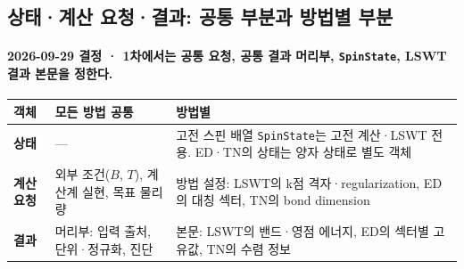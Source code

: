 \subsection{상태·계산 요청·결과: 공통 부분과 방법별 부분}\label{object-scope}
\begingroup%
  \framesubtitle{2026-09-29 결정 · 1차에서는 공통 요청, 공통 결과 머리부, \texttt{SpinState}, LSWT 결과 본문을 정한다.}
  \begin{tabularx}{\textwidth}{@{}p{2.0cm}P{5.0cm}Y@{}}
    \toprule
    객체 & 모든 방법 공통 & 방법별 \\
    \midrule
    \textbf{상태} & — & 고전 스핀 배열 \texttt{SpinState}는 고전 계산·LSWT 전용. ED·TN의 상태는 양자 상태로 별도 객체 \\
    \textbf{계산 요청} & 외부 조건($B$, $T$), 계산계 실현, 목표 물리량 & 방법 설정: LSWT의 k점 격자·regularization, ED의 대칭 섹터, TN의 bond dimension \\
    \textbf{결과} & 머리부: 입력 출처, 단위·정규화, 진단 & 본문: LSWT의 밴드·영점 에너지, ED의 섹터별 고유값, TN의 수렴 정보 \\
    \bottomrule
  \end{tabularx}
  \par\medskip
\endgroup


